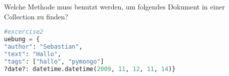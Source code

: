 Welche Methode muss benutzt werden, um  folgendes Dokument in einer Collection zu finden?
\begin{lstlisting}[language=Python]
#excercise2
uebung = {	
"author": "Sebastian",
"text": "Hallo",
"tags": ["hallo", "pymongo"]
?date?: datetime.datetime(2009, 11, 12, 11, 14)}
\end{lstlisting}\label{database02:lst:excercise2}

